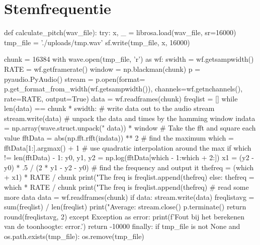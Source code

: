 \section{Stemfrequentie}
\begin{python}
def calculate_pitch(wav_file):
    try:
        x, _ = librosa.load(wav_file, sr=16000)
        tmp_file = './uploads/tmp.wav'
        sf.write(tmp_file, x, 16000)

        chunk = 16384
        with wave.open(tmp_file, 'r') as wf:
            swidth = wf.getsampwidth()
            RATE = wf.getframerate()
            window = np.blackman(chunk)
            p = pyaudio.PyAudio()
            stream = p.open(format=
                p.get_format_from_width(wf.getsampwidth()),
                channels=wf.getnchannels(),
                rate=RATE,
                output=True)
            data = wf.readframes(chunk)
            freqlist = []
            while len(data) == chunk * swidth:
                # write data out to the audio stream
                stream.write(data)
                # unpack the data and times by the hamming window
                indata = np.array(wave.struct.unpack("%
                data)) * window
                # Take the fft and square each value
                fftData = abs(np.fft.rfft(indata)) ** 2
                # find the maximum
                which = fftData[1:].argmax() + 1
                # use quadratic interpolation around the max
                if which != len(fftData) - 1:
                    y0, y1, y2 = np.log(fftData[which - 1:which + 2:])
                    x1 = (y2 - y0) * .5 / (2 * y1 - y2 - y0)
                    # find the frequency and output it
                    thefreq = (which + x1) * RATE / chunk
                    print("The freq is %
                    freqlist.append(thefreq)
                else:
                    thefreq = which * RATE / chunk
                    print("The freq is %
                    freqlist.append(thefreq)
                # read some more data
                data = wf.readframes(chunk)
        if data:
            stream.write(data)
        freqlistavg = sum(freqlist) / len(freqlist)
        print("Average: %
        stream.close()
        p.terminate()
        return round(freqlistavg, 2)
    except Exception as error:
        print(f'Fout bij het berekenen van de toonhoogte: {error}.')
        return -10000
    finally:
        if tmp_file is not None and os.path.exists(tmp_file):
            os.remove(tmp_file)
\end{python}

